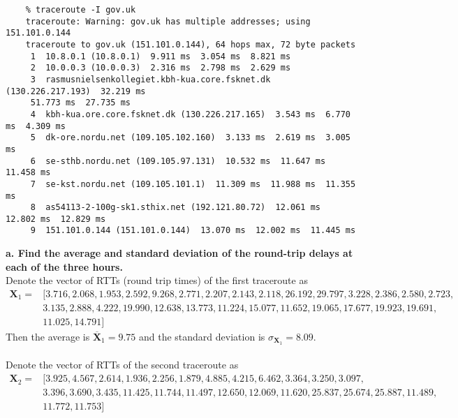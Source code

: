 \begin{verbatim}
    % traceroute -I gov.uk     
    traceroute: Warning: gov.uk has multiple addresses; using 151.101.0.144
    traceroute to gov.uk (151.101.0.144), 64 hops max, 72 byte packets
     1  10.8.0.1 (10.8.0.1)  9.911 ms  3.054 ms  8.821 ms
     2  10.0.0.3 (10.0.0.3)  2.316 ms  2.798 ms  2.629 ms
     3  rasmusnielsenkollegiet.kbh-kua.core.fsknet.dk (130.226.217.193)  32.219 ms  
     51.773 ms  27.735 ms
     4  kbh-kua.ore.core.fsknet.dk (130.226.217.165)  3.543 ms  6.770 ms  4.309 ms
     5  dk-ore.nordu.net (109.105.102.160)  3.133 ms  2.619 ms  3.005 ms
     6  se-sthb.nordu.net (109.105.97.131)  10.532 ms  11.647 ms  11.458 ms
     7  se-kst.nordu.net (109.105.101.1)  11.309 ms  11.988 ms  11.355 ms
     8  as54113-2-100g-sk1.sthix.net (192.121.80.72)  12.061 ms  12.802 ms  12.829 ms
     9  151.101.0.144 (151.101.0.144)  13.070 ms  12.002 ms  11.445 ms
\end{verbatim}
\textbf{a. Find the average and standard deviation of the round-trip delays at each of the three hours.} \\
Denote the vector of RTTs (round trip times) of the first traceroute as 
\begin{equation*}
\begin{split}
    \mathbf{X}_1 = &[
        3.716, 2.068, 1.953,
        2.592, 9.268, 2.771,
        2.207, 2.143, 2.118,
        26.192, 29.797, 3.228,
        2.386, 2.580, 2.723, \\
        &3.135, 2.888, 4.222,
        19.990, 12.638, 13.773,
        11.224, 15.077, 11.652,
        19.065, 17.677, 19.923,
        19.691, \\
        &11.025, 14.791
    ]
\end{split}
\end{equation*}
Then the average is $\overline{\mathbf{X}}_1 = 9.75$ and the standard deviation is $\sigma_{\mathbf{X}_1} = 8.09$. \\
\\
Denote the vector of RTTs of the second traceroute as
\begin{equation*}
\begin{split}
    \mathbf{X}_2 = &[
        3.925, 4.567, 2.614,
        1.936, 2.256, 1.879,
        4.885, 4.215, 6.462,
        3.364, 3.250, 3.097, \\
        &3.396, 3.690, 3.435,
        11.425, 11.744, 11.497,
        12.650, 12.069, 11.620,
        25.837, 25.674, 25.887,
        11.489, \\
        &11.772, 11.753
    ]
\end{split}
\end{equation*}
